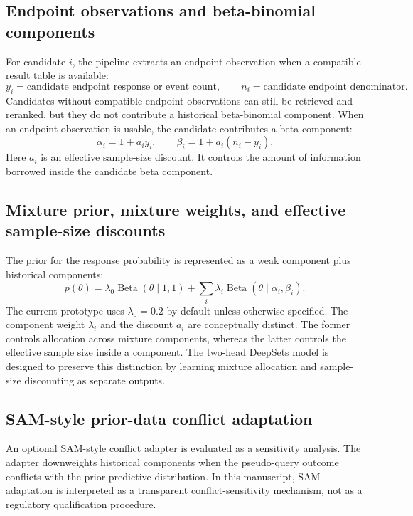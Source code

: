 \documentclass[11pt]{article}
\begin{document}
\subsection{Endpoint observations and beta-binomial components}

For candidate $i$, the pipeline extracts an endpoint observation when a compatible result table is available:
\[
y_i = \text{candidate endpoint response or event count}, \qquad
n_i = \text{candidate endpoint denominator}.
\]
Candidates without compatible endpoint observations can still be retrieved and reranked, but they do not contribute a historical beta-binomial component. When an endpoint observation is usable, the candidate contributes a beta component:
\[
\alpha_i = 1 + a_i y_i, \qquad
\beta_i = 1 + a_i(n_i-y_i).
\]
Here $a_i$ is an effective sample-size discount. It controls the amount of information borrowed inside the candidate beta component.

\subsection{Mixture prior, mixture weights, and effective sample-size discounts}

The prior for the response probability is represented as a weak component plus historical components:
\[
p(\theta) =
\lambda_0 \operatorname{Beta}(\theta \mid 1,1)
+ \sum_i \lambda_i \operatorname{Beta}(\theta \mid \alpha_i,\beta_i).
\]
The current prototype uses $\lambda_0=0.2$ by default unless otherwise specified. The component weight $\lambda_i$ and the discount $a_i$ are conceptually distinct. The former controls allocation across mixture components, whereas the latter controls the effective sample size inside a component. The two-head DeepSets model is designed to preserve this distinction by learning mixture allocation and sample-size discounting as separate outputs.

\subsection{SAM-style prior-data conflict adaptation}

An optional SAM-style conflict adapter is evaluated as a sensitivity analysis. The adapter downweights historical components when the pseudo-query outcome conflicts with the prior predictive distribution. In this manuscript, SAM adaptation is interpreted as a transparent conflict-sensitivity mechanism, not as a regulatory qualification procedure.
\end{document}
